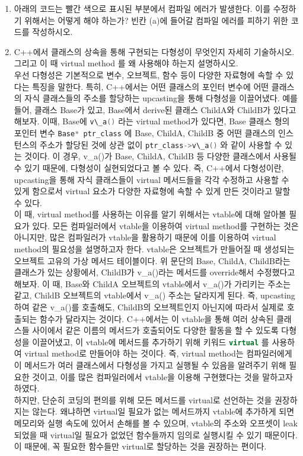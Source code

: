 \documentclass{article}
\newcommand{\inline}[1]{%
    \colorbox{beta-gray}{\lstinline[language=C++]{#1}}%
}
\begin{document}
\begin{enumerate}[itemsep=30pt]
        \item 아래의 코드는 빨간 색으로 표시된 부분에서 컴파일 에러가 발생한다. 이를 수정하기 위해서는 어떻게 해야 하는가? 빈칸 (a)에 들어갈 컴파일 에러를 피하기 위한 코드를 작성하시오.
        \item C++에서 클래스의 상속을 통해 구현되는 다형성이 무엇인지 자세히 기술하시오. 그리고 이 때 virtual method 를 왜 사용해야 하는지 설명하시오. \\
              우선 다형성은 기본적으로 변수, 오브젝트, 함수 등이 다양한 자료형에 속할 수 있다는 특징을 말한다.
              특히, C++에서는 어떤 클래스의 포인터 변수에 어떤 클래스의 자식 클래스들의 주소를 할당하는 upcasting을 통해 다형성을 이끌어냈다.
              예를 들어, 클래스 Base가 있고, Base에서 derive된 클래스 ChildA와 ChildB가 있다고 해보자.
              이때, Base에 \inline{v\_a()}라는 virtual method가 있다면, Base 클래스 형의 포인터 변수 \inline{Base* ptr_class}에
              Base, ChildA, ChildB 중 어떤 클래스의 인스턴스의 주소가 할당된 것에 상관 없이 \inline{ptr_class->v\_a()}와 같이 사용할 수 있는 것이다.
              이 경우, v\_a()가 Base, ChildA, ChildB 등 다양한 클래스에서 사용될 수 있기 때문에, 다형성이 실현되었다고 볼 수 있다. 즉, C++에서 다형성이란,
              upcasting을 통해 자식 클래스들이 virtual 메서드들을 각각 수정하고 사용할 수 있게 함으로서 virtual 요소가 다양한 자료형에 속할 수 있게 만든 것이라고 말할 수 있다. \\
              이 때, virtual method를 사용하는 이유를 알기 위해서는 vtable에 대해 알아볼 필요가 있다. 모든 컴파일러에서 vtable을 이용하여 virtual method를 구현하는 것은 아니지만, 많은 컴파일러가 vtable을 활용하기 때문에 이를 이용하여 virtual method의 필요성을 설명하고자 한다.
              vtable은 오브젝트가 만들어질 때 생성되는 오브젝트 고유의 가상 메서드 테이블이다.
              위 문단의 Base, ChildA, ChildB라는 클래스가 있는 상황에서, ChildB가 v\_a()라는 메서드를 override해서 수정했다고 해보자.
              이 때, Base와 ChildA 오브젝트의 vtable에서 v\_a()가 가리키는 주소는 같고, ChildB 오브젝트의 vtable에서  v\_a() 주소는 달라지게 된다.
              즉, upcasting 하여 같은 v\_a()를 호출해도, ChildB의 오브젝트인지 아닌지에 따라서 실제로 호출되는 함수가 달라지는 것이다.
              C++에서는 이 vtable을 통해 여러 상속된 클래스들 사이에서 같은 이름의 메서드가 호출되어도 다양한 활동을 할 수 있도록 다형성을 이끌어냈고,
              이 vtable에 메서드를 추가하기 위해 키워드 \inline{virtual}를 사용하여 virtual method로 만들어야 하는 것이다.
              즉, virtual method는 컴파일러에게 이 메서드가 여러 클래스에서 다형성을 가지고 실행될 수 있음을 알려주기 위해 필요한 것이고, 이를 많은 컴파일러에서 vtable을 이용해 구현했다는 것을 말하고자 하였다.\\
              하지만, 단순히 코딩의 편의를 위해 모든 메서드를 virtual로 선언하는 것을 권장하지는 않는다.
              왜냐하면 virtual일 필요가 없는 메서드까지 vtable에 추가하게 되면 메모리와 실행 속도에 있어서 손해를 볼 수 있으며,
              vtable의 주소와 오프셋이 leak 되었을 때 virtual일 필요가 없었던 함수들까지 임의로 실행시킬 수 있기 때문이다. 이 때문에, 꼭 필요한 함수들만 virtual로 할당하는 것을 권장하는 편이다.


\end{enumerate}
\end{document}
